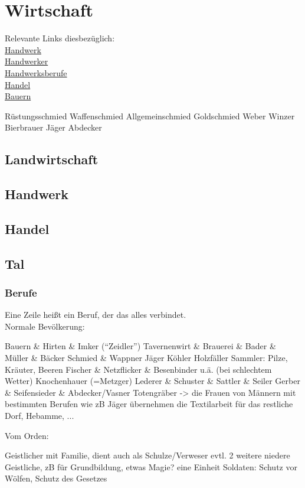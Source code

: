\chapter{Wirtschaft}
Relevante Links diesbezüglich: \\
\href{https://www.leben-im-mittelalter.net/kultur-im-mittelalter/wirtschaft/handwerk.html}{Handwerk} \\
\href{https://www.leben-im-mittelalter.net/alltag-im-mittelalter/arbeit-und-berufe/handwerker.html}{Handwerker} \\
\href{https://www.leben-im-mittelalter.net/alltag-im-mittelalter/arbeit-und-berufe/handwerker/handwerksberufe.html}{Handwerksberufe} \\
\href{https://www.leben-im-mittelalter.net/kultur-im-mittelalter/wirtschaft/handel.html}{Handel}\\
\href{https://www.leben-im-mittelalter.net/alltag-im-mittelalter/arbeit-und-berufe/bauern.html}{Bauern}\\


\begin{outline}
	\1 Rüstungsschmied
	\1 Waffenschmied
	\1 Allgemeinschmied
	\1 Goldschmied
	\1 Weber
	\1 Winzer
	\1 Bierbrauer
	\1 Jäger
	\1 Abdecker
\end{outline}

\section{Landwirtschaft}


\section{Handwerk}

\section{Handel}

\section{Tal}
\subsection{Berufe}
Eine Zeile heißt ein Beruf, der das alles verbindet. \\
Normale Bevölkerung:
\begin{outline}
	\1 Bauern \& Hirten \& Imker ("`Zeidler"')
	\1 Tavernenwirt \& Brauerei \& Bader \& Müller \& Bäcker
	\1 Schmied \& Wappner
	\1 Jäger
	\1 Köhler
	\1 Holzfäller
	\1 Sammler: Pilze, Kräuter, Beeren
	\1 Fischer \& Netzflicker \& Besenbinder u.ä. (bei schlechtem Wetter)
	\1 Knochenhauer (=Metzger)
	\1 Lederer \& Schuster \& Sattler \& Seiler
	\1 Gerber \& Seifensieder \& Abdecker/Vasner
	\1 Totengräber
	\1 -> die Frauen von Männern mit bestimmten Berufen wie zB Jäger übernehmen die Textilarbeit für das restliche Dorf, Hebamme, ...
\end{outline}

Vom Orden:
\begin{outline}
	\1 Geistlicher mit Familie, dient auch als Schulze/Verweser
	\1 evtl. 2 weitere niedere Geistliche, zB für Grundbildung, etwas Magie?
	\1 eine Einheit Soldaten: Schutz vor Wölfen, Schutz des Gesetzes
\end{outline}
